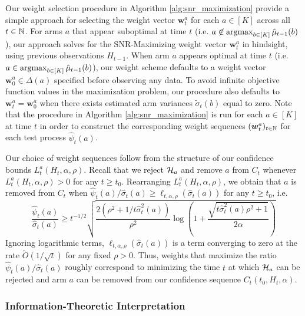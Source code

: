 \documentclass{article}
\begin{document}
Our weight selection procedure in Algorithm \ref{alg:snr_maximization} provide a simple approach for selecting the weight vector $\bm{w}_t^a$ for each $a \in [K]$ across all $t \in \mathbb{N}$. For arms $a$ that appear suboptimal at time $t$ (i.e. $a\not\in \argmax_{b \in [K]}\hat\mu_{t-1}(b)$), our approach solves for the SNR-Maximizing weight vector $\bm{w}_t^a$ in hindsight, using previous observations $H_{t-1}$. When arm $a$ appears optimal at time $t$ (i.e. $a \in \argmax_{b \in [K]} \hat\mu_{t-1}(b)$), our weight scheme defaults to a weight vector $\bm{w}_0^a \in \Delta(a)$ specified before observing any data. %
To avoid infinite objective function values in the maximization problem, our procedure also defaults to $\bm{w}_t^a = \bm{w}_0^a$ when there exists estimated arm variances $\tilde\sigma_t(b)$ equal to zero. Note that the procedure in Algorithm \ref{alg:snr_maximization} is run for each $a \in [K]$ at time $t$ in order to construct the corresponding weight sequences $(\boldsymbol{w}_t^a)_{t \in \mathbb{N}}$ for each test process $\hat\psi_t(a)$. 

Our choice of weight sequences follow from  the structure of our confidence bounds $L_t^a(H_t, \alpha, \rho)$. Recall that we reject $\mathcal{H}_a$ and remove $a$ from $C_t$ whenever $L_t^a(H_t, \alpha, \rho) > 0$ for any $t \geq t_0$. Rearranging $L_t^a(H_t, \alpha, \rho)$, we obtain that $a$ is removed from $C_t$ when $\hat\psi_t(a)/\hat\sigma_t(a) \geq \ell_{t, \alpha, \rho}(\hat\sigma_t(a))$ for any $t \geq t_0$, i.e.
\begin{equation}
    \frac{\hat\psi_t(a)}{\hat\sigma_t(a)} \geq t^{-1/2}\sqrt{\frac{2\left(\rho^2+1/t\hat\sigma^2_t(a)\right)}{\rho^2}\log\left(1+\frac{\sqrt{t \hat\sigma^2_t(a)\rho^2 + 1}}{2\alpha}\right)} 
\end{equation}
Ignoring logarithmic terms, $\ell_{t,\alpha,\rho}(\hat\sigma_t(a))$ is a term converging to zero at the rate $\tilde{O}(1/\sqrt{t})$ for any fixed $\rho > 0$. Thus, weights that maximize the ratio $\hat\psi_t(a)/\hat\sigma_t(a)$ roughly correspond to minimizing the time $t$ at which $\mathcal{H}_a$ can be rejected and arm $a$ can be removed from our confidence sequence $C_t(t_0,H_t, \alpha)$. 

\subsubsection{Information-Theoretic Interpretation}
\end{document}
